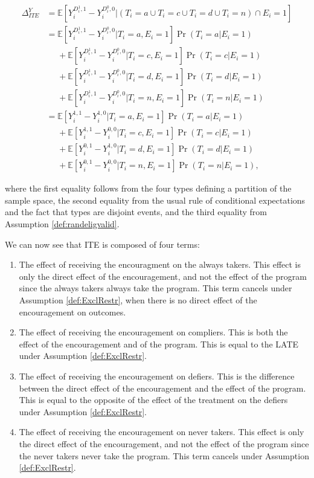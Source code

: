\documentclass[
]{book}
\providecommand{\tightlist}{%
  \setlength{\itemsep}{0pt}\setlength{\parskip}{0pt}}
\newcommand{\esp}[1]{\mathbb{E}[ #1 ]}
\theoremstyle{definition}
\theoremstyle{definition}
\theoremstyle{definition}
\theoremstyle{definition}
\theoremstyle{remark}
\begin{document}
\begin{align}
  \Delta^Y_{ITE} & = \esp{Y_i^{D_i^1,1}-Y_i^{D_i^0,0}|(T_i=a\cup T_i=c\cup T_i=d\cup T_i=n)\cap E_i=1}\nonumber\\
                & = \esp{Y_i^{D_i^1,1}-Y_i^{D_i^0,0}|T_i=a,E_i=1}\Pr(T_i=a|E_i=1)\nonumber\\
                & \phantom{=}+ \esp{Y_i^{D_i^1,1}-Y_i^{D_i^0,0}|T_i=c,E_i=1}\Pr(T_i=c|E_i=1)\nonumber\\
                & \phantom{=}+ \esp{Y_i^{D_i^1,1}-Y_i^{D_i^0,0}|T_i=d,E_i=1}\Pr(T_i=d|E_i=1)\nonumber\\
                & \phantom{=}+ \esp{Y_i^{D_i^1,1}-Y_i^{D_i^0,0}|T_i=n,E_i=1}\Pr(T_i=n|E_i=1)\nonumber\\
                & = \esp{Y_i^{1,1}-Y_i^{1,0}|T_i=a,E_i=1}\Pr(T_i=a|E_i=1)\nonumber\\
                & \phantom{=}+ \esp{Y_i^{1,1}-Y_i^{0,0}|T_i=c,E_i=1}\Pr(T_i=c|E_i=1)\nonumber\\
                & \phantom{=}+ \esp{Y_i^{0,1}-Y_i^{1,0}|T_i=d,E_i=1}\Pr(T_i=d|E_i=1)\nonumber\\
                & \phantom{=}+ \esp{Y_i^{0,1}-Y_i^{0,0}|T_i=n,E_i=1}\Pr(T_i=n|E_i=1),\label{eq:ITE3}
\end{align}

where the first equality follows from the four types defining a partition of the sample space, the second equality from the usual rule of conditional expectations and the fact that types are disjoint events, and the third equality from Assumption \ref{def:randeligvalid}.

We can now see that ITE is composed of four terms:

\begin{enumerate}
\def\labelenumi{\arabic{enumi}.}
\tightlist
\item
  The effect of receiving the encouragment on the always takers.
  This effect is only the direct effect of the encouragement, and not the effect of the program since the always takers always take the program.
  This term cancels under Assumption \ref{def:ExclRestr}, when there is no direct effect of the encouragement on outcomes.
\item
  The effect of receiving the encouragement on compliers.
  This is both the effect of the encouragement and of the program.
  This is equal to the LATE under Assumption \ref{def:ExclRestr}.
\item
  The effect of receiving the encouragement on defiers.
  This is the difference between the direct effect of the encouragement and the effect of the program.
  This is equal to the opposite of the effect of the treatment on the defiers under Assumption \ref{def:ExclRestr}.
\item
  The effect of receiving the encouragement on never takers.
  This effect is only the direct effect of the encouragement, and not the effect of the program since the never takers never take the program.
  This term cancels under Assumption \ref{def:ExclRestr}.
\end{enumerate}
\end{document}
